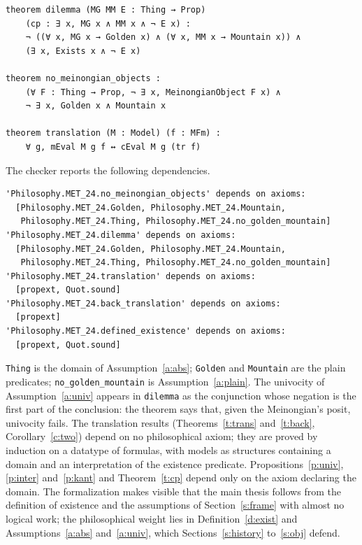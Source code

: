 \documentclass{situationist-preprint}
\begin{document}
\begin{lstlisting}
theorem dilemma (MG MM E : Thing → Prop)
    (cp : ∃ x, MG x ∧ MM x ∧ ¬ E x) :
    ¬ ((∀ x, MG x → Golden x) ∧ (∀ x, MM x → Mountain x)) ∧
    (∃ x, Exists x ∧ ¬ E x)

theorem no_meinongian_objects :
    (∀ F : Thing → Prop, ¬ ∃ x, MeinongianObject F x) ∧
    ¬ ∃ x, Golden x ∧ Mountain x

theorem translation (M : Model) (f : MFm) :
    ∀ g, mEval M g f ↔ cEval M g (tr f)
\end{lstlisting}

\noindent The checker reports the following dependencies.

\begin{lstlisting}
'Philosophy.MET_24.no_meinongian_objects' depends on axioms:
  [Philosophy.MET_24.Golden, Philosophy.MET_24.Mountain,
   Philosophy.MET_24.Thing, Philosophy.MET_24.no_golden_mountain]
'Philosophy.MET_24.dilemma' depends on axioms:
  [Philosophy.MET_24.Golden, Philosophy.MET_24.Mountain,
   Philosophy.MET_24.Thing, Philosophy.MET_24.no_golden_mountain]
'Philosophy.MET_24.translation' depends on axioms:
  [propext, Quot.sound]
'Philosophy.MET_24.back_translation' depends on axioms:
  [propext]
'Philosophy.MET_24.defined_existence' depends on axioms:
  [propext, Quot.sound]
\end{lstlisting}

\texttt{Thing} is the domain of Assumption~\ref{a:abs}; \texttt{Golden} and \texttt{Mountain} are the plain predicates; \texttt{no\_golden\_mountain} is Assumption~\ref{a:plain}. The univocity of Assumption~\ref{a:univ} appears in \texttt{dilemma} as the conjunction whose negation is the first part of the conclusion: the theorem says that, given the Meinongian's posit, univocity fails. The translation results (Theorems~\ref{t:trans} and~\ref{t:back}, Corollary~\ref{c:two}) depend on no philosophical axiom; they are proved by induction on a datatype of formulas, with models as structures containing a domain and an interpretation of the existence predicate. Propositions~\ref{p:univ}, \ref{p:inter} and~\ref{p:kant} and Theorem~\ref{t:cp} depend only on the axiom declaring the domain. The formalization makes visible that the main thesis follows from the definition of existence and the assumptions of Section~\ref{s:frame} with almost no logical work; the philosophical weight lies in Definition~\ref{d:exist} and Assumptions~\ref{a:abs} and~\ref{a:univ}, which Sections~\ref{s:history} to~\ref{s:obj} defend.
\end{document}
